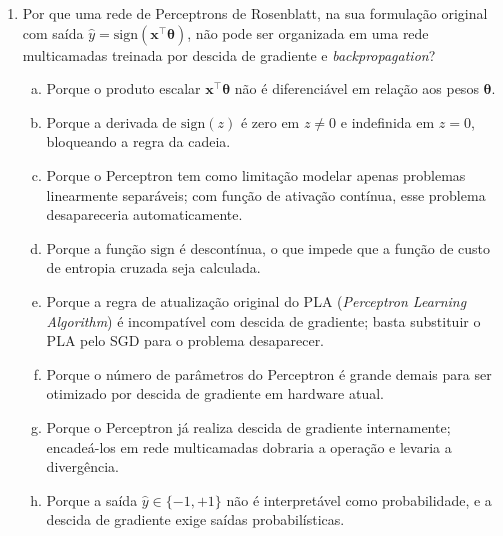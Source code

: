 \documentclass{dlproblemset}
\begin{document}
\begin{enumerate}[1)]
    \item Por que uma rede de Perceptrons de Rosenblatt, na sua formulação original com saída $\hat{y} = \mathrm{sign}(\mathbf{x}^\top \boldsymbol{\theta})$, não pode ser organizada em uma rede multicamadas treinada por descida de gradiente e \textit{backpropagation}?
    \begin{enumerate}[(a)]
        \item Porque o produto escalar $\mathbf{x}^\top \boldsymbol{\theta}$ não é diferenciável em relação aos pesos $\boldsymbol{\theta}$.
        \item Porque a derivada de $\mathrm{sign}(z)$ é zero em $z \neq 0$ e indefinida em $z = 0$, bloqueando a regra da cadeia.
        \item Porque o Perceptron tem como limitação modelar apenas problemas linearmente separáveis; com função de ativação contínua, esse problema desapareceria automaticamente.
        \item Porque a função $\mathrm{sign}$ é descontínua, o que impede que a função de custo de entropia cruzada seja calculada.
        \item Porque a regra de atualização original do PLA (\textit{Perceptron Learning Algorithm}) é incompatível com descida de gradiente; basta substituir o PLA pelo SGD para o problema desaparecer.
        \item Porque o número de parâmetros do Perceptron é grande demais para ser otimizado por descida de gradiente em hardware atual.
        \item Porque o Perceptron já realiza descida de gradiente internamente; encadeá-los em rede multicamadas dobraria a operação e levaria a divergência.
        \item Porque a saída $\hat{y} \in \{-1, +1\}$ não é interpretável como probabilidade, e a descida de gradiente exige saídas probabilísticas.
    \end{enumerate}


\end{enumerate}
\end{document}

